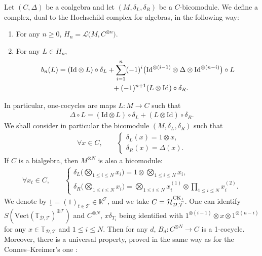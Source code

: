 \documentclass[pdftex]{sigma}
\numberwithin{equation}{section}
\newcommand{\K}{\mathbb{K}}
\newcommand{\T}{\mathcal{T}}
\newcommand{\D}{\mathcal{D}}
\newcommand{\h}{\mathcal{H}}
\newcommand{\bfT}{\mathbb{T}}
\newcommand{\id}{\mathrm{Id}}
\begin{document}
Let $(C,\Delta)$ be a coalgebra and let $(M,\delta_L,\delta_R)$ be a $C$-bicomodule.
We define a complex, dual to the Hochschild complex for algebras, in the following way:
\begin{enumerate}\itemsep=0pt
\item For any $n\geq 0$, $H_n=\mathcal{L}\big(M,C^{\otimes n}\big)$.
\item For any $L\in H_n$,
\begin{gather*}
b_n(L)=(\id\otimes L)\circ \delta_L+\sum_{i=1}^n (-1)^i \big(\id^{\otimes (i-1)}\otimes \Delta \otimes \id^{\otimes(n-i)}\big)\circ L
\\ \hphantom{b_n(L)=}
{}+(-1)^{n+1}(L\otimes \id)\circ \delta_R.
\end{gather*}
\end{enumerate}
In particular, one-cocycles are maps $L\colon M\longrightarrow C$ such that
\begin{gather*}\Delta \circ L=(\id\otimes L)\circ \delta_L+(L\otimes \id)\circ \delta_R.\end{gather*}
We shall consider in particular the bicomodule $(M,\delta_L,\delta_R)$ such that
\begin{gather*}
\forall x\in C,\qquad \begin{cases}
\delta_L(x)=1\otimes x,\\
\delta_R(x)=\Delta(x).
\end{cases}
\end{gather*}
If $C$ is a bialgebra, then $M^{\otimes N}$ is also a bicomodule:
\begin{align*}
\forall x_t\in C,\qquad
\begin{cases}
\displaystyle \delta_L\Big(\bigotimes_{1\leq i \leq N} x_i\Big)=1\otimes \bigotimes_{1\leq i \leq N} x_i,\\[5mm]
\displaystyle \delta_R\Big(\bigotimes_{1\leq i \leq N} x_i\Big)
=\bigotimes_{1\leq i \leq N} x_i^{(1)}\otimes \prod_{1\leq i \leq N} x_i^{(2)}.
\end{cases} \end{align*}
We denote by $\underline{1}=(1)_{t\in \T} \in \K^\T$, and we take $C=\h_{\D,\T}^{{\rm CK}_{\underline{1}}}$.
One can identify $S\left(\mathrm{Vect}(\bfT_{\D,\T})^{\oplus \T}\right)$ and $C^{\otimes N}$,
$x\delta_{T_i}$ being identified with $1^{\otimes (i-1)}\otimes x\otimes 1^{\otimes (n-i)}$
for any $x\in \bfT_{\D,\T}$ and $1\leq i \leq N$. Then for any $d$,
$B_d\colon C^{\otimes N}\longrightarrow C$ is a 1-cocycle. Moreover, there is a universal property,
proved in the same way as for the Connes--Kreimer's one \cite{ConnesKreimer}:
\end{document}
